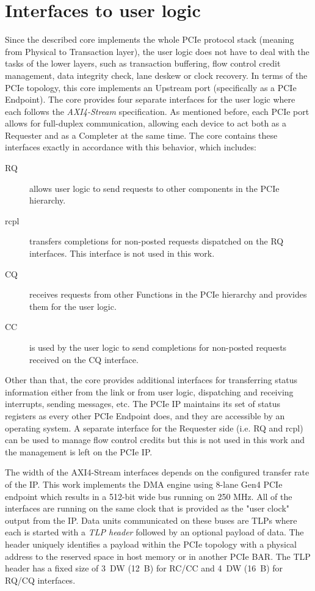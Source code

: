 \section{Interfaces to user logic}

Since the described core implements the whole PCIe protocol stack (meaning from Physical to
Transaction layer), the user logic does not have to deal with the tasks of the lower layers, such as
transaction buffering, flow control credit management, data integrity check, lane deskew or clock
recovery. In terms of the PCIe topology, this core implements an Upstream port (specifically as a
PCIe Endpoint). The core provides four separate interfaces for the user logic where each follows the
\emph{AXI4-Stream} specification\cite{axis_spec}. As mentioned before, each PCIe port allows for
full-duplex communication, allowing each device to act both as a Requester and as a Completer at the
same time. The core contains these interfaces exactly in accordance with this behavior,
which includes:

\begin{description}
    \item[\ac{RQ}] allows user logic to send requests to other components in the PCIe
    hierarchy.
    \item[\ac{rcpl}] transfers completions for non-posted requests dispatched on the RQ
    interfaces. This interface is not used in this work.
    \item[\ac{CQ}] receives requests from other Functions in the PCIe hierarchy and provides
    them for the user logic.
    \item[\ac{CC}] is used by the user logic to send completions for non-posted requests
    received on the CQ interface.
\end{description}

Other than that, the core provides additional interfaces for transferring status information either
from the link or from user logic, dispatching and receiving interrupts, sending messages, etc. The
PCIe IP maintains its set of status registers as every other PCIe Endpoint does, and they are accessible by an
operating system. A separate interface for the Requester side (i.e. \ac{RQ} and \ac{rcpl}) can be
used to manage flow control credits but this is not used in this work and the management is left on
the PCIe IP.

The width of the AXI4-Stream interfaces depends on the configured transfer rate of the IP. This work
implements the DMA engine using 8-lane Gen4 PCIe endpoint which results in a 512-bit wide bus
running on 250 MHz. All of the interfaces are running on the same clock that is provided as the
"user clock" output from the IP\cite{pcie_amd_ip}. Data units communicated on these buses are
\acp{TLP} where each is started with a \emph{TLP header} followed by an optional payload of data. The
header uniquely identifies a payload within the PCIe topology with a physical address to the
reserved space in host memory or in another PCIe BAR. The TLP header has a fixed size of 3~DW (12~B)
for RC/CC and 4~DW (16~B) for RQ/CQ interfaces.


